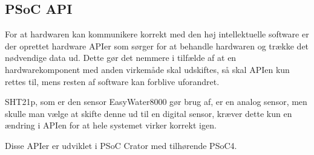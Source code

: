 \subsection{PSoC API}

For at hardwaren kan kommunikere korrekt med den høj intellektuelle software er der oprettet hardware APIer som sørger for at behandle hardwaren og trække det nødvendige data ud. Dette gør det nemmere i tilfælde af at en hardwarekomponent med anden virkemåde skal udskiftes, så skal APIen kun rettes til, mens resten af software kan forblive uforandret. 

SHT21p, som er den sensor EasyWater8000 gør brug af, er en analog sensor, men skulle man vælge at skifte denne ud til en digital sensor, kræver dette kun en ændring i APIen for at hele systemet virker korrekt igen. 

Disse APIer er udviklet i PSoC Crator med tilhørende PSoC4. 